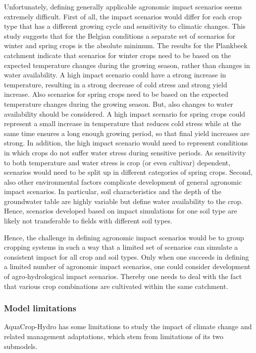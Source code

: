 Unfortunately, defining generally applicable agronomic impact scenarios seems extremely difficult. First of all, the impact scenarios would differ for each crop type that has a different growing cycle and sensitivity to climatic changes. This study suggests that for the Belgian conditions a separate set of scenarios for winter and spring crops is the absolute minimum. The results for the Plankbeek catchment indicate that scenarios for winter crops need to be based on the expected temperature changes during the growing season, rather than changes in water availability. A high impact scenario could have a strong increase in temperature, resulting in a strong decrease of cold stress and strong yield increase. Also scenarios for spring crops need to be based on the expected temperature changes during the growing season. But, also changes to water availability should be considered. A high impact scenario for spring crops could represent a small increase in temperature that reduces cold stress while at the same time ensures a long enough growing period, so that final yield increases are strong. In addition, the high impact scenario would need to represent conditions in which crops do not suffer water stress during sensitive periods. As sensitivity to both temperature and water stress is crop (or even cultivar) dependent, scenarios would need to be split up in different categories of spring crops. Second, also other environmental factors complicate development of general agronomic impact scenarios. In particular, soil characteristics and the depth of the groundwater table are highly variable but define water availability to the crop. Hence, scenarios developed based on impact simulations for one soil type are likely not transferable to fields with different soil types. 

Hence, the challenge in defining agronomic impact scenarios would be to group cropping systems in such a way that a limited set of scenarios can simulate a consistent impact for all crop and soil types. Only when one succeeds in defining a limited number of agronomic impact scenarios, one could consider development of agro-hydrological impact scenarios. Thereby one needs to deal with the fact that various crop combinations are cultivated within the same catchment. 

\subsubsection{Model limitations}
AquaCrop-Hydro has some limitations to study the impact of climate change and related management adaptations, which stem from limitations of its two submodels. 

